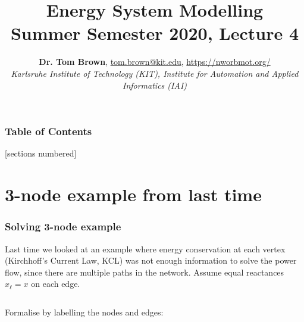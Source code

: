 \documentclass[10pt,aspectratio=169,dvipsnames]{beamer}
\title{Energy System Modelling\\ Summer Semester 2020, Lecture 4}
\author{
  {\bf Dr. Tom Brown}, \href{mailto:tom.brown@kit.edu}{tom.brown@kit.edu}, \url{https://nworbmot.org/}\\
  \emph{Karlsruhe Institute of Technology (KIT), Institute for Automation and Applied Informatics (IAI)}
}
\date{}
\begin{document}
\maketitle


\begin{frame}

  \frametitle{Table of Contents}
  [sections numbered]
  \tableofcontents[hideallsubsections]
\end{frame}



\section{3-node example from last time}


\begin{frame}
  \frametitle{Solving 3-node example}

  Last time we looked at an example where energy conservation at each
  vertex (Kirchhoff's Current Law, KCL) was not enough information to
  solve the power flow, since there are multiple paths in the network.
  Assume equal reactances $x_\ell = x$ on each edge.

  \vspace{.3cm}

  \begin{columns}


    \centering




      Formalise by labelling the nodes and edges:


\end{columns}
\end{frame}
\end{document}
